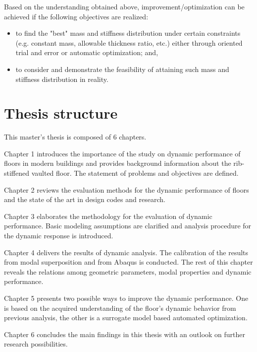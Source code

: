 Based on the understanding obtained above, improvement/optimization can be achieved if the following objectives are realized:
\begin{itemize}
    \item to find the "best" mass and stiffness distribution under certain constraints (e.g. constant mass, allowable thickness ratio, etc.) either through oriented trial and error or automatic optimization; and,
    \item to consider and demonstrate the feasibility of attaining such mass and stiffness distribution in reality.
\end{itemize}


\section{Thesis structure}
This master's thesis is composed of 6 chapters.

Chapter 1 introduces the importance of the study on dynamic performance of floors in modern buildings and provides background information about the rib-stiffened vaulted floor. The statement of problems and objectives are defined.

Chapter 2 reviews the evaluation methods for the dynamic performance of floors and the state of the art in design codes and research.

Chapter 3 elaborates the methodology for the evaluation of dynamic performance. Basic modeling assumptions are clarified and analysis procedure for the dynamic response is introduced.

Chapter 4 delivers the results of dynamic analysis. The calibration of the results from modal superposition and from Abaqus is conducted. The rest of this chapter reveals the relations among geometric parameters, modal properties and dynamic performance. 

Chapter 5 presents two possible ways to improve the dynamic performance. One is based on the acquired understanding of the floor's dynamic behavior from previous analysis, the other is a surrogate model based automated optimization.

Chapter 6 concludes the main findings in this thesis with an outlook on further research possibilities. 



























